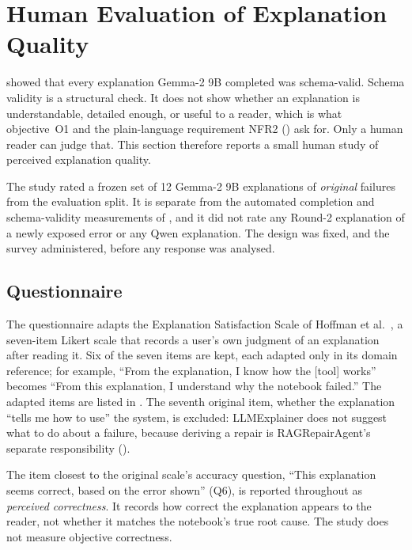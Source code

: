 \iffalse
\section{Human Evaluation of Explanation Quality}
\label{sec:v-human-eval}

 showed that every explanation Gemma-2 9B
completed was schema-valid. Schema validity is a structural check. It
does not show whether an explanation is understandable, detailed enough,
or useful to a reader, which is what objective~O1 and the plain-language
requirement NFR2 () ask for. Only a human
reader can judge that. This section therefore reports a small human study
of perceived explanation quality.

The study rated a frozen set of 12 Gemma-2 9B explanations of
\emph{original} failures from the evaluation split. It is separate from
the automated completion and schema-validity measurements of
, and it did not rate any Round-2
explanation of a newly exposed error or any Qwen explanation. The design
was fixed, and the survey administered, before any response was analysed.

\subsection{Questionnaire}
\label{sec:v-human-eval-instrument}

The questionnaire adapts the Explanation Satisfaction Scale of Hoffman et
al.~\cite{hoffman2023measures}, a seven-item Likert scale that records a
user's own judgment of an explanation after reading it. Six of the seven
items are kept, each adapted only in its domain reference; for example,
``From the explanation, I know how the [tool] works'' becomes ``From this
explanation, I understand why the notebook failed.'' The adapted items
are listed in . The seventh original
item, whether the explanation ``tells me how to use'' the system, is
excluded: LLMExplainer does not suggest what to do about a failure,
because deriving a repair is RAGRepairAgent's separate responsibility
().

The item closest to the original scale's accuracy question, ``This
explanation seems correct, based on the error shown'' (Q6), is reported
throughout as \emph{perceived correctness}. It records how correct the
explanation appears to the reader, not whether it matches the notebook's
true root cause. The study does not measure objective correctness.


